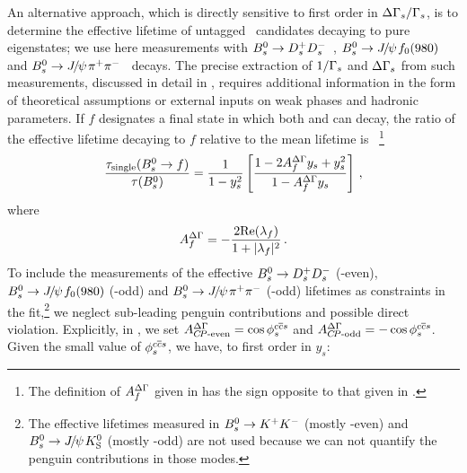 An alternative approach, which is directly sensitive to first order in 
$\Delta\Gamma_{s}/\Gamma_{s}$, 
is to determine the effective lifetime of untagged \Bs\ candidates
decaying to %
pure \CP eigenstates; we use here measurements with
$B^0_s \to D_s^+D_s^-$~\cite{Aaij:2013bvd}, 
$B^0_s \to {J\mskip -3mu/\mskip -2mu\psi\mskip 2mu} f_0(980)$~\cite{Aaltonen:2011nk}
and $B^0_s\to {J\mskip -3mu/\mskip -2mu\psi\mskip 2mu} \pi^+\pi^-$~\cite{Aaij:2013oba,*LHCb:2011aa_mod,*LHCb:2012ad_mod,*LHCb:2011ab_mod,*Aaij:2012nta_mod} decays.
The precise extraction of $1/\Gamma_{s}$ and $\Delta\Gamma_{s}$
from such measurements, discussed in detail in , 
requires additional information 
in the form of theoretical assumptions or
external inputs on weak phases and hadronic parameters. 
If $f$ designates a final state in which both \Bs and \Bsbar can decay,
the ratio of the effective \Bs lifetime decaying to $f$ relative to the mean
\Bs lifetime is~\cite{Fleischer:2011cw}%
\footnote{
  \label{foot:life_mix:ADG-def}
  The definition of $A_f^{\Delta\Gamma}$ given in  has the sign opposite to that given in .}
\begin{equation}
  \frac{\tau_{\rm single}(\Bs \to f)}{\tau(\Bs)} = \frac{1}{1-y_s^2} \left[ \frac{1 - 2A_f^{\DG} y_s + y_s^2}{1 - A_f^{\DG} y_s}\right ] \,,
\labe{tauf_fleisch}
\end{equation}
where
\begin{equation}
A_f^{\DG} = -\frac{2 \Re(\lambda_f)} {1+|\lambda_f|^2} \,.
\labe{ADG}
\end{equation}
To include the measurements of the effective
$B^0_s \to D_s^+D_s^-$ (\CP-even), $B^0_s \to {J\mskip -3mu/\mskip -2mu\psi\mskip 2mu} f_0(980)$ (\CP-odd) and
$B^0_s \to {J\mskip -3mu/\mskip -2mu\psi\mskip 2mu}\pi^+\pi^-$ (\CP-odd) 
lifetimes as constraints in the \DGs fit,\footnote{%
The effective lifetimes measured in $B^0_s\to K^+ K^-$ (mostly \CP-even) and  $B^0_s \to {J\mskip -3mu/\mskip -2mu\psi\mskip 2mu} K_{\rm S}^0$ (mostly \CP-odd) are not used because we can not quantify the penguin contributions in those modes.}
we neglect sub-leading penguin contributions and possible direct \CP violation. 
Explicitly, in , we set
$A_{\mbox{\scriptsize \CP-even}}^{\DG} = \cos \phiccbars$
and $A_{\mbox{\scriptsize \CP-odd}}^{\DG} = -\cos \phiccbars$.
Given the small value of $\phiccbars$, we have, to first order in $y_s$:
